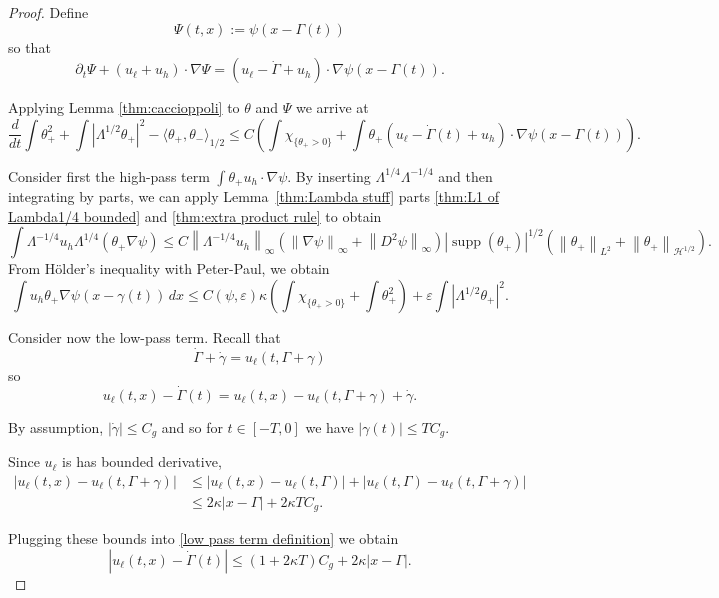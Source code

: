 \documentclass[11pt]{amsart}
\theoremstyle{remark}
\theoremstyle{definition}
\newcommand{\eps}{\varepsilon}
\newcommand{\chevron}[1]{\langle #1 \rangle}
\newcommand{\norm}[1]{\left\lVert#1\right\rVert}
\newcommand{\paren}[1]{\left( #1 \right)}
\newcommand{\abs}[1]{\left\lvert #1 \right\rvert}
\DeclareMathOperator{\supp}{supp}
\newcommand{\del}{\partial}
\newcommand{\grad}{\nabla}
\newcommand{\ddt}{\frac{d}{dt}}
\newcommand{\n}{^{-1}}
\newcommand{\indic}[1]{\chi_{\{#1\}}}
\newcommand{\ulow}{u_\ell}
\newcommand{\uhigh}{u_h}
\newcommand{\HD}{\mathcal{H}}
\newcommand{\Cgamma}{C_g}
\begin{document}
\begin{proof}
Define 
\[ \Psi(t,x) := \psi(x - \Gamma(t)) \]
so that
\[ \del_t \Psi + (\ulow + \uhigh)\cdot\grad \Psi = (\ulow - \dot{\Gamma} + \uhigh)\cdot \grad \psi(x-\Gamma(t)). \]

Applying Lemma \ref{thm:caccioppoli} to $\theta$ and $\Psi$ we arrive at
\[ \ddt \int \theta_+^2 + \int \abs{\Lambda^{1/2} \theta_+}^2 - \chevron{\theta_+,\theta_-}_{1/2} \leq C \paren{ \int \indic{\theta_+ > 0} + \int \theta_+ (\ulow-\dot{\Gamma}(t) + \uhigh) \cdot \grad\psi(x-\Gamma(t)) }. \]

Consider first the high-pass term $\int \theta_+ \uhigh\cdot\grad\psi$.  By inserting $\Lambda^{1/4}\Lambda^{-1/4}$ and then integrating by parts, we can apply Lemma~\ref{thm:Lambda stuff} parts \eqref{thm:L1 of Lambda1/4 bounded} and \eqref{thm:extra product rule} to obtain
\[ \int \Lambda^{-1/4} \uhigh \Lambda^{1/4} (\theta_+ \grad\psi) \leq C \norm{\Lambda^{-1/4} \uhigh}_\infty \paren{\norm{\grad\psi}_\infty + \norm{D^2 \psi}_\infty} |\supp(\theta_+)|^{1/2} \paren{ \norm{\theta_+}_{L^2} + \norm{\theta_+}_{\HD^{1/2}}}. \]
From H\"{o}lder's inequality with Peter-Paul, we obtain
\[ \int \uhigh \theta_+ \grad \psi(x - \gamma(t)) \,dx \leq C(\psi,\eps) \kappa \paren{\int \indic{\theta_+>0} + \int \theta_+^2} + \eps \int \abs{\Lambda^{1/2} \theta_+}^2. \]

Consider now the low-pass term.  Recall that
\[ \dot{\Gamma} + \dot{\gamma} = \ulow(t, \Gamma+\gamma) \]
so
\begin{equation} \label{low pass term definition} \ulow(t,x) - \dot{\Gamma}(t) = \ulow(t,x) - \ulow(t,\Gamma+\gamma) + \dot{\gamma}. \end{equation}

By assumption, $|\dot{\gamma}|\leq \Cgamma$ and so for $t \in [-T,0]$ we have $|\gamma(t)| \leq T \Cgamma$.  

Since $\ulow$ is has bounded derivative,
\begin{align*} 
|\ulow(t,x) - \ulow(t,\Gamma+\gamma)| &\leq  |\ulow(t,x)-\ulow(t,\Gamma)| + |\ulow(t,\Gamma) - \ulow(t,\Gamma+\gamma)| 
\\ &\leq 2\kappa |x-\Gamma| + 2\kappa T \Cgamma. 
\end{align*}

Plugging these bounds into \eqref{low pass term definition} we obtain
\[ \abs{\ulow(t,x) - \dot{\Gamma}(t)} \leq (1+2\kappa T) \Cgamma + 2\kappa |x-\Gamma|. \]


\end{proof}
\end{document}
